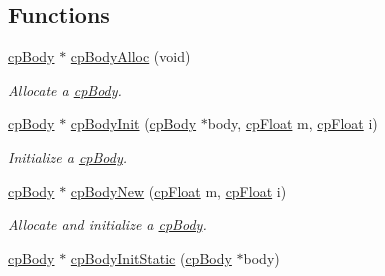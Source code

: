 \subsection*{Functions}
\begin{DoxyCompactItemize}
\item 
\hypertarget{group__cp_body_gadd622b6503c89fa5a8c0f43a0917d2a2}{\hyperlink{structcp_body}{cp\-Body} $\ast$ \hyperlink{group__cp_body_gadd622b6503c89fa5a8c0f43a0917d2a2}{cp\-Body\-Alloc} (void)}\label{group__cp_body_gadd622b6503c89fa5a8c0f43a0917d2a2}

\begin{DoxyCompactList}\small\item\em Allocate a \hyperlink{structcp_body}{cp\-Body}. \end{DoxyCompactList}\item 
\hypertarget{group__cp_body_gad91c665ae18b191e8de5f59e1e20eea9}{\hyperlink{structcp_body}{cp\-Body} $\ast$ \hyperlink{group__cp_body_gad91c665ae18b191e8de5f59e1e20eea9}{cp\-Body\-Init} (\hyperlink{structcp_body}{cp\-Body} $\ast$body, \hyperlink{group__basic_types_gac1ed65573e035bf892505768c852d8d3}{cp\-Float} m, \hyperlink{group__basic_types_gac1ed65573e035bf892505768c852d8d3}{cp\-Float} i)}\label{group__cp_body_gad91c665ae18b191e8de5f59e1e20eea9}

\begin{DoxyCompactList}\small\item\em Initialize a \hyperlink{structcp_body}{cp\-Body}. \end{DoxyCompactList}\item 
\hypertarget{group__cp_body_ga0d0be6b47dee41b4989f5feebc7a5ce4}{\hyperlink{structcp_body}{cp\-Body} $\ast$ \hyperlink{group__cp_body_ga0d0be6b47dee41b4989f5feebc7a5ce4}{cp\-Body\-New} (\hyperlink{group__basic_types_gac1ed65573e035bf892505768c852d8d3}{cp\-Float} m, \hyperlink{group__basic_types_gac1ed65573e035bf892505768c852d8d3}{cp\-Float} i)}\label{group__cp_body_ga0d0be6b47dee41b4989f5feebc7a5ce4}

\begin{DoxyCompactList}\small\item\em Allocate and initialize a \hyperlink{structcp_body}{cp\-Body}. \end{DoxyCompactList}\item 
\hypertarget{group__cp_body_gad9c3073c3fc9f0c0acd29a32761868c2}{\hyperlink{structcp_body}{cp\-Body} $\ast$ \hyperlink{group__cp_body_gad9c3073c3fc9f0c0acd29a32761868c2}{cp\-Body\-Init\-Static} (\hyperlink{structcp_body}{cp\-Body} $\ast$body)}\label{group__cp_body_gad9c3073c3fc9f0c0acd29a32761868c2}


\end{DoxyCompactItemize}
